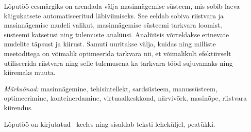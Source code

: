 Lõputöö eesmärgiks on arendada välja masinnägemise süsteem, mis sobib laeva käigukatsete automatiseeritud läbiviimiseks. See eeldab sobiva riistvara ja masinnägemise mudeli valikut, masinnägemise süsteemi tarkvara loomist, süsteemi katsetusi ning tulemuste analüüsi. Analüüsis võrreldakse erinevate mudelite täpsust ja kiirust. Samuti uuritakse välja, kuidas ning milliste meetoditega on võimalik optimeerida tarkvara nii, et võimalikult efektiivselt utiliseerida riistvara ning selle tulemusena ka tarkvara tööd sujuvamaks ning kiiremaks muuta.

\textit{Märksõnad:} masinnägemine, tehisintellekt, sardsüsteem, manussüsteem, optimeerimine, konteinerdamine, virtuaalkeskkond, närvivõrk, masinõpe, riistvara kiirendus.

Lõputöö on kirjutatud \langEst~keeles ning sisaldab teksti \calculatepages leheküljel,
 peatükki.
